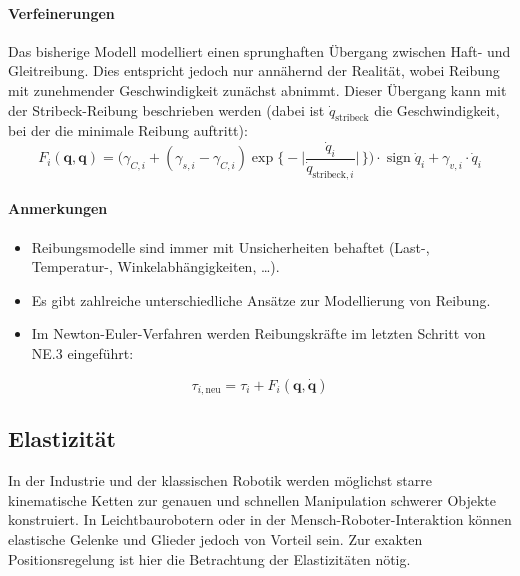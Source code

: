 \documentclass[a4paper, 11pt, accentcolor = tud3b]{tudreport}
\DeclareMathOperator{\sign}{sign}
\renewcommand{\vec}[1]{\boldsymbol{\mathbf{#1}}}
\begin{document}
					\paragraph{Verfeinerungen}
						Das bisherige Modell modelliert einen sprunghaften Übergang zwischen Haft- und Gleitreibung. Dies entspricht jedoch nur annähernd der Realität, wobei Reibung mit zunehmender Geschwindigkeit zunächst abnimmt. Dieser Übergang kann mit der Stribeck-Reibung beschrieben werden (dabei ist \( \dot{q}_\text{stribeck} \) die Geschwindigkeit, bei der die minimale Reibung auftritt):
						\begin{equation*}
							F_i(\vec{q}, \vec{q}\!) = \Bigg( \gamma_{C, i} + (\gamma_{s, i} - \gamma_{C, i}) \exp \bigg\{\! -\Big\lvert \frac{\dot{q}_i}{\dot{q}_{\text{stribeck}, i}} \Big\rvert \,\bigg\} \Bigg) \cdot \sign \dot{q}_i + \gamma_{v, i} \cdot \dot{q}_i
						\end{equation*}
					
					\paragraph{Anmerkungen}
						\begin{itemize}
							\item Reibungsmodelle sind immer mit Unsicherheiten behaftet (Last-, Temperatur-, Winkelabhängigkeiten, \dots).
							\item Es gibt zahlreiche unterschiedliche Ansätze zur Modellierung von Reibung.
							\item Im Newton-Euler-Verfahren werden Reibungskräfte im letzten Schritt von NE.3 eingeführt:
						\end{itemize}
						\begin{equation*}
							\tau_{i, \text{neu}} = \tau_i + F_i(\vec{q}, \dot{\vec{q}}\!)
						\end{equation*}

			\subsection{Elastizität}
				In der Industrie und der klassischen Robotik werden möglichst starre kinematische Ketten zur genauen und schnellen Manipulation schwerer Objekte konstruiert. In Leichtbaurobotern oder in der Mensch-Roboter-Interaktion können elastische Gelenke und Glieder jedoch von Vorteil sein. Zur exakten Positionsregelung ist hier die Betrachtung der Elastizitäten nötig.
\end{document}
